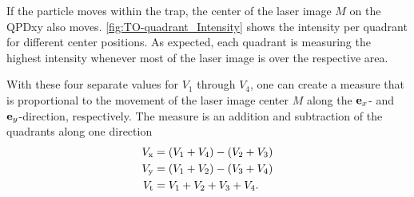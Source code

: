 If the particle moves within the trap, the center of the laser image $M$ on the 
QPDxy also moves. \cref{fig:TO-quadrant_Intensity} shows the intensity per 
quadrant for different center positions. As expected, each quadrant is 
measuring the highest intensity whenever most of the laser image is over the 
respective area.

With these four separate values for $V_{1}$ through $V_{4}$, one can create a 
measure that is proportional to the movement of the laser image center $M$ 
along the $\vb{e}_{x}$- and $\vb{e}_{y}$-direction, respectively. The measure is an addition 
and subtraction of the quadrants along one direction
\begin{subequations}
\begin{align}
  V_{\mathrm{x}} & = \left( V_{\mathrm{1}}+V_{\mathrm{4}} \right) - \left( V_{\mathrm{2}} + 
  V_{\mathrm{3}}  \right)
  \label{eq:TO-Vx} \\
  V_{\mathrm{y}} & = \left( V_{\mathrm{1}}+V_{\mathrm{2}} \right) - \left( V_{\mathrm{3}} + 
  V_{\mathrm{4}}  \right)
  \label{eq:TO-Vy} \\
  V_{\mathrm{t}} & = V_{\mathrm{1}}+V_{\mathrm{2}} + V_{\mathrm{3}} + V_{\mathrm{4}}.
  \label{eq:TO-Vt}
\end{align}
\end{subequations}

